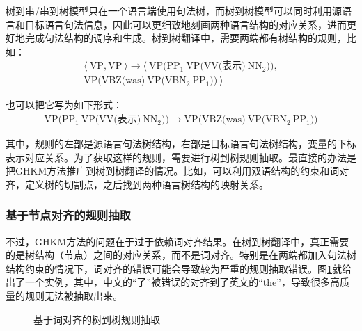 \parinterval 树到串/串到树模型只在一个语言端使用句法树，而树到树模型可以同时利用源语言和目标语言句法信息，因此可以更细致地刻画两种语言结构的对应关系，进而更好地完成句法结构的调序和生成。树到树翻译中，需要两端都有树结构的规则，比如：
\begin{eqnarray}
\langle\ \textrm{VP},\textrm{VP}\ \rangle \rightarrow \langle\ \textrm{VP(}\textrm{PP}_1\ \textrm{VP(VV(表示)}\ \textrm{NN}_2\textrm{))}, \nonumber \\
\textrm{VP(VBZ(was)}\ \textrm{VP(}\textrm{VBN}_2\ \textrm{PP}_1\textrm{))}\ \rangle \nonumber
\end{eqnarray}

\parinterval 也可以把它写为如下形式：
\begin{eqnarray}
\textrm{VP(}\textrm{PP}_1\ \textrm{VP(VV(表示)}\ \textrm{NN}_2\textrm{))} \rightarrow \textrm{VP(VBZ(was)}\ \textrm{VP(}\textrm{VBN}_2\ \textrm{PP}_1\textrm{))} \nonumber
\end{eqnarray}

\noindent 其中，规则的左部是源语言句法树结构，右部是目标语言句法树结构，变量的下标表示对应关系。为了获取这样的规则，需要进行树到树规则抽取。最直接的办法是把GHKM方法推广到树到树翻译的情况。比如，可以利用双语结构的约束和词对齐，定义树的切割点，之后找到两种语言树结构的映射关系\cite{liu2009improving}。


\subsubsection{基于节点对齐的规则抽取}

\parinterval 不过，GHKM方法的问题在于过于依赖词对齐结果。在树到树翻译中，真正需要的是树结构（节点）之间的对应关系，而不是词对齐。特别是在两端都加入句法树结构约束的情况下，词对齐的错误可能会导致较为严重的规则抽取错误。图\ref{fig:4-61}就给出了一个实例，其中，中文的``了''被错误的对齐到了英文的``the''，导致很多高质量的规则无法被抽取出来。

\begin{figure}[htp]
\centering

\caption{基于词对齐的树到树规则抽取}
\label{fig:4-61}
\end{figure}

